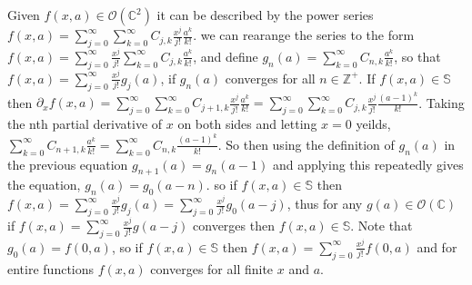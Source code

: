 \documentclass[%
 onecolumn,
 amsmath, amssymb, aps, pra, 10pt
]{revtex4-2}
\begin{document}
Given $f(x, a) \in \mathcal{O}(\mathbb{C}^2)$ it can be described by the power series $f(x, a) = \sum_{j=0}^{\infty} \sum_{k=0}^{\infty} C_{j, k} \frac{x^j}{j!} \frac{a^k}{k!}$. we can rearange the series to  the form $f(x, a) = \sum_{j=0}^{\infty} \frac{x^j}{j!} \sum_{k=0}^{\infty} C_{j, k} \frac{a^k}{k!}$, and define $g_n(a) = \sum_{k=0}^{\infty} C_{n, k} \frac{a^k}{k!}$, so that $f(x, a) = \sum_{j=0}^{\infty} \frac{x^j}{j!} g_j(a)$, if $g_n(a)$ converges for all $n \in \mathbb{Z}^+$. If $f(x, a) \in \mathbb{S}$ then $\partial_x f(x, a) = \sum_{j=0}^{\infty} \sum_{k=0}^{\infty} C_{j + 1, k} \frac{x^j}{j!} \frac{a^k}{k!} = \sum_{j=0}^{\infty} \sum_{k=0}^{\infty} C_{j, k} \frac{x^j}{j!} \frac{(a - 1)^k}{k!}$. Taking the nth partial derivative of $x$ on both sides and letting $x=0$ yeilds, $\sum_{k=0}^{\infty} C_{n + 1, k} \frac{a^k}{k!} = \sum_{k=0}^{\infty} C_{n, k} \frac{(a -1)^k}{k!}$. So then using the definition of $g_n(a)$ in the previous equation $g_{n+1}(a) = g_{n}(a - 1)$ and applying this repeatedly gives the equation, $g_{n}(a) = g_{0}(a - n)$. so if $f(x, a) \in \mathbb{S}$ then $f(x, a) = \sum_{j=0}^{\infty} \frac{x^j}{j!} g_{j}(a) = \sum_{j=0}^{\infty} \frac{x^j}{j!} g_{0}(a - j)$, thus for any $g(a) \in \mathcal{O}(\mathbb{C})$ if $f(x, a) = \sum_{j=0}^{\infty} \frac{x^j}{j!} g(a - j)$ converges then $f(x, a) \in \mathbb{S}$. Note that $g_{0}(a) = f(0, a)$, so if $f(x, a) \in \mathbb{S}$ then $f(x, a) = \sum_{j=0}^{\infty} \frac{x^j}{j!} f(0, a)$ and for entire functions $f(x, a)$ converges for all finite $x$ and $a$.




\end{document}
